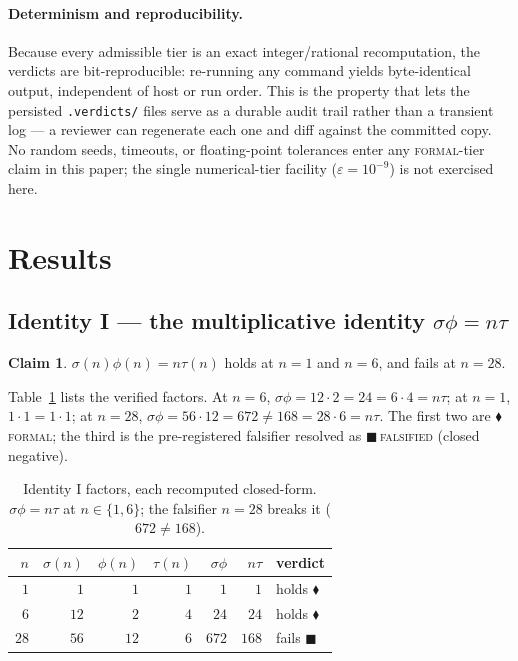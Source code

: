 \documentclass[11pt,a4paper]{article}
\newcommand{\sig}{\sigma}
\theoremstyle{definition}
\newtheorem{claim}{Claim}
\begin{document}
\paragraph{Determinism and reproducibility.} Because every admissible tier is an exact integer/rational recomputation, the verdicts are bit-reproducible: re-running any command yields byte-identical output, independent of host or run order. This is the property that lets the persisted \texttt{.verdicts/} files serve as a durable audit trail rather than a transient log --- a reviewer can regenerate each one and diff against the committed copy. No random seeds, timeouts, or floating-point tolerances enter any \textsc{formal}-tier claim in this paper; the single numerical-tier facility ($\varepsilon=10^{-9}$) is not exercised here.

\section{Results}
\label{sec:results}

\subsection{Identity I --- the multiplicative identity \texorpdfstring{$\sig\phi=n\tau$}{}}
\label{sec:I}

\begin{claim}
$\sig(n)\phi(n)=n\tau(n)$ holds at $n=1$ and $n=6$, and fails at $n=28$.
\end{claim}
\noindent Table~\ref{tab:I} lists the verified factors. At $n=6$,
$\sig\phi=12\cdot 2=24=6\cdot 4=n\tau$; at $n=1$, $1\cdot1=1\cdot1$; at $n=28$,
$\sig\phi=56\cdot 12=672\neq 168=28\cdot 6=n\tau$. The first two are
\textcolor{blue!60!black}{$\blacklozenge$}\,\textsc{formal}; the third is the
pre-registered falsifier resolved as
\textcolor{red!70!black}{$\blacksquare$}\,\textsc{falsified} (closed negative).

\begin{table}[h]
\centering
\caption{Identity I factors, each recomputed closed-form. $\sig\phi=n\tau$ at
$n\in\{1,6\}$; the falsifier $n=28$ breaks it ($672\neq168$).}
\label{tab:I}
\begin{tabular}{rrrrrrl}
\toprule
$n$ & $\sig(n)$ & $\phi(n)$ & $\tau(n)$ & $\sig\phi$ & $n\tau$ & verdict\\
\midrule
$1$  & $1$  & $1$  & $1$ & $1$   & $1$   & holds \textcolor{blue!60!black}{$\blacklozenge$}\\
$6$  & $12$ & $2$  & $4$ & $24$  & $24$  & holds \textcolor{blue!60!black}{$\blacklozenge$}\\
$28$ & $56$ & $12$ & $6$ & $672$ & $168$ & fails \textcolor{red!70!black}{$\blacksquare$}\\
\bottomrule
\end{tabular}
\end{table}
\end{document}
